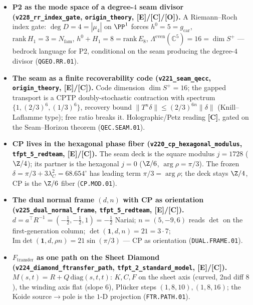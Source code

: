 \documentclass[11pt]{article}
\providecommand{\mE}{\textbf{[E]}}\providecommand{\mC}{\textbf{[C]}}
\providecommand{\mO}{\textbf{[O]}}\providecommand{\mX}{\textbf{[X]}}
\providecommand{\gcar}{g_{\mathrm{car}}}\providecommand{\Nfam}{N_{\mathrm{fam}}}
\begin{document}
\begin{itemize}
  $128{=}\mathrm{rank}\cdot\dim S^+$ (phase/glue channel); the red-team Target~D magnitude bijection
  lives in $120$, the un-covered CP phases in $128$; the dark-sector reading of $128$ stays Frontier
  (replaces the over-strong $S^-$ reading; \texttt{E8.CHAN.01}).
\item \textbf{P2 as the mode space of a degree-$4$ seam divisor (\texttt{v228\_rr\_index\_gate},
  \texttt{origin\_theory}, \mE/\mC/\mO).} A Riemann--Roch index gate: $\deg D{=}4{=}|\mu_4|$ on $\PP^1$
  forces $h^0{=}5{=}\gcar$, $\mathrm{rank}\,H_1{=}3{=}\Nfam$, $h^0{+}H_1{=}8{=}\mathrm{rank}\,E_8$,
  $\Lambda^{\mathrm{even}}(\mathbb C^5){=}16{=}\dim S^+$ --- bedrock language for P2, conditional on the
  seam producing the degree-$4$ divisor (\texttt{QGEO.RR.01}).
\item \textbf{The seam as a finite recoverability code (\texttt{v221\_seam\_qecc},
  \texttt{origin\_theory}, \mE/\mC).} Code dimension $\dim S^+{=}16$; the gapped transport is a CPTP
  doubly-stochastic contraction with spectrum $\{1,(2/3)^6,(1/3)^6\}$, recovery bound
  $\|T^n\delta\|{\le}(2/3)^{6n}\|\delta\|$ (Knill--Laflamme type); free ratio breaks it. Holographic/Petz
  reading \mC, gated on the Seam--Horizon theorem (\texttt{QEC.SEAM.01}).
\item \textbf{CP lives in the hexagonal phase fiber (\texttt{v220\_cp\_hexagonal\_modulus},
  \texttt{tfpt\_5\_redteam}, \mE/\mC).} The seam deck is the square modulus $j{=}1728$ ($\Z/4$); its
  partner is the hexagonal $j{=}0$ ($\Z/6$, $\arg\rho{=}\pi/3$). The frozen $\delta{=}\pi/3{+}3\lambda_C^2
  {=}68.654^\circ$ has leading term $\pi/3{=}\arg\rho$; the deck stays $\Z/4$, CP is the $\Z/6$ fiber
  (\texttt{CP.MOD.01}).
\item \textbf{The dual normal frame $(d,n)$ with CP as orientation (\texttt{v225\_dual\_normal\_frame},
  \texttt{tfpt\_5\_redteam}, \mE/\mC).} $d{=}a^\top R^{-1}{=}({-}\tfrac12,{-}\tfrac12,1){=}{-}\tfrac12$
  Nariai; $n{=}(5,{-}9,6)$ reads $\det$ on the first-generation column; $\det(\mathbf1,d,n){=}21{=}3{\cdot}7$;
  $\mathrm{Im}\det(\mathbf1,d,\rho n){=}21\sin(\pi/3)$ --- CP as orientation (\texttt{DUAL.FRAME.01}).
\item \textbf{$F_{\mathrm{transfer}}$ as one path on the Sheet Diamond (\texttt{v224\_diamond\_ftransfer\_path},
  \texttt{tfpt\_2\_standard\_model}, \mE/\mC).} $M(s,t){=}R{+}Q\,\mathrm{diag}(s,t,t)$: $K,C,F$ on the
  sheet axis (curved, 2nd diff $8$), the winding axis flat (slope $6$), Pl\"ucker steps $(1,8,10),(1,8,16)$;
  the Koide source$\to$pole is the $1$-D projection (\texttt{FTR.PATH.01}).

\end{itemize}
\end{document}
